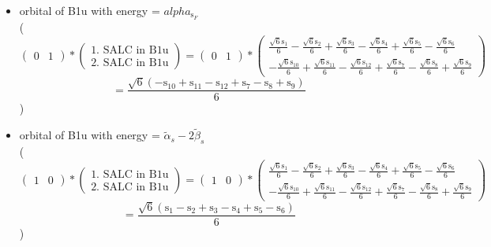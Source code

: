\documentclass[12pt,a4paper]{article}
\begin{document}
\begin{itemize}
\textcolor{red}{Error in Orthogonalization of SALCs}\item orbital of B1u with energy = 
                                $alpha_{\text{s}_F}$ \\
( 
$$
\begin{pmatrix}0 & 1\end{pmatrix} * \left(\begin{array}{c}\text{1. SALC in B1u} \\ \text{2. SALC in B1u}\end{array}\right) = \begin{pmatrix}0 & 1\end{pmatrix} * \begin{pmatrix}\frac{\sqrt{6} \text{s}_{1}}{6} - \frac{\sqrt{6} \text{s}_{2}}{6} + \frac{\sqrt{6} \text{s}_{3}}{6} - \frac{\sqrt{6} \text{s}_{4}}{6} + \frac{\sqrt{6} \text{s}_{5}}{6} - \frac{\sqrt{6} \text{s}_{6}}{6}\\- \frac{\sqrt{6} \text{s}_{10}}{6} + \frac{\sqrt{6} \text{s}_{11}}{6} - \frac{\sqrt{6} \text{s}_{12}}{6} + \frac{\sqrt{6} \text{s}_{7}}{6} - \frac{\sqrt{6} \text{s}_{8}}{6} + \frac{\sqrt{6} \text{s}_{9}}{6}\end{pmatrix} 
 $$ $$ = \frac{\sqrt{6} \left(- \text{s}_{10} + \text{s}_{11} - \text{s}_{12} + \text{s}_{7} - \text{s}_{8} + \text{s}_{9}\right)}{6} 
 $$ 
 )

\item orbital of B1u with energy = 
                                $\tilde{\alpha}_{s} - 2 \tilde{\beta}_{s}$ \\
( 
$$
\begin{pmatrix}1 & 0\end{pmatrix} * \left(\begin{array}{c}\text{1. SALC in B1u} \\ \text{2. SALC in B1u}\end{array}\right) = \begin{pmatrix}1 & 0\end{pmatrix} * \begin{pmatrix}\frac{\sqrt{6} \text{s}_{1}}{6} - \frac{\sqrt{6} \text{s}_{2}}{6} + \frac{\sqrt{6} \text{s}_{3}}{6} - \frac{\sqrt{6} \text{s}_{4}}{6} + \frac{\sqrt{6} \text{s}_{5}}{6} - \frac{\sqrt{6} \text{s}_{6}}{6}\\- \frac{\sqrt{6} \text{s}_{10}}{6} + \frac{\sqrt{6} \text{s}_{11}}{6} - \frac{\sqrt{6} \text{s}_{12}}{6} + \frac{\sqrt{6} \text{s}_{7}}{6} - \frac{\sqrt{6} \text{s}_{8}}{6} + \frac{\sqrt{6} \text{s}_{9}}{6}\end{pmatrix} 
 $$ $$ = \frac{\sqrt{6} \left(\text{s}_{1} - \text{s}_{2} + \text{s}_{3} - \text{s}_{4} + \text{s}_{5} - \text{s}_{6}\right)}{6} 
 $$ 
 )

\end{itemize}
\end{document}
